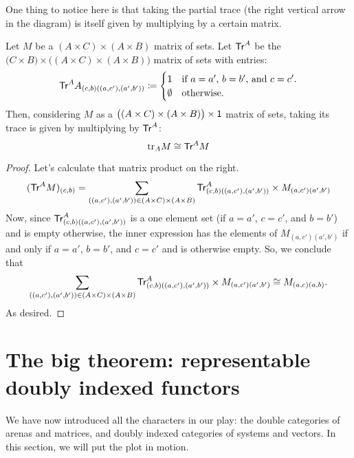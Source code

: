 \documentclass[DynamicalBook]{subfiles}
\begin{document}
One thing to notice here is that taking the partial trace (the right vertical
arrow in the diagram) is itself given by multiplying by a certain matrix.
\begin{proposition}\label{prop.trace_multiplying_by_matrix}
  Let $M$ be a $(A \times C) \times (A \times B)$ matrix of sets. Let
  $\mathsf{Tr}^A$ be the $\big(C \times B \big) \times \big((A \times C) \times (A
  \times B)\big)$ matrix of sets with entries:
  \[
    \mathsf{Tr}^A{A}_{(c, b)((a,c'),(a', b'))} \coloneqq \begin{cases} 
      \mathsf{1} &\mbox{if $a = a'$, $b = b'$, and $c = c'$.} \\
      \emptyset &\mbox{otherwise.}
    \end{cases} 
\]
  Then, considering $M$ as a $\big((A \times C) \times (A \times B)\big) \times
  \mathsf{1}$ matrix of sets, taking its trace is given by multiplying by $\mathsf{Tr}^A$:
$$\mathrm{tr}_{A}M \cong \mathsf{Tr}^A M$$
\end{proposition}
\begin{proof}
  Let's calculate that matrix product on the right.
  \begin{align*}
    (\mathsf{Tr}^A M)_{(c, b)} &= \sum_{((a, c'), (a', b')) \in (A \times C) \times (A \times B)} \mathsf{Tr}^A_{(c,b)((a, c'),(a', b'))} \times M_{(a,c')(a',b')} \\
  \end{align*}
  Now, since $\mathsf{Tr}^A_{(c,b)((a,c'),(a',b'))}$ is a one element set (if $a =
  a'$, $c = c'$, and $b = b'$) and is empty otherwise, the inner expression has
  the elements of $M_{(a,c')(a', b')}$ if and only if $a = a'$, $b = b'$, and $c
  = c'$ and is otherwise empty. So, we conclude that
  \[
\sum_{((a, c'), (a', b')) \in (A \times C) \times (A \times B)}
\mathsf{Tr}^A_{(c,b)((a, c'),(a', b'))} \times M_{(a,c')(a',b')} \cong M_{(a, c)(a,
  b)}.
\]
As desired.
\end{proof}








\section{The big theorem: representable doubly indexed functors}

We have now introduced all the characters in our play: the double categories of
arenas and matrices, and doubly indexed categories of systems and vectors. In
this section, we will put the plot in motion. 
\end{document}
